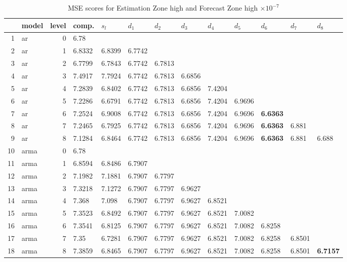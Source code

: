 \documentclass[10pt,a4paper]{article}
\begin{document}
\begin{table}[ht]
\centering
\caption{MSE scores for Estimation Zone high and Forecast Zone high $ \times 10^{-7}$} 
\begin{tabular}{rlrllllllllll}
  \hline
 & model & level & comp. & $s_l$ & $d_1$ & $d_2$ & $d_3$ & $d_4$ & $d_5$ & $d_6$ & $d_7$ & $d_8$ \\ 
  \hline
1 & ar &     0 & 6.78 &  &  &  &  &  &  &  &  &  \\ 
  2 & ar &     1 & 6.8332 & 6.8399 & 6.7742 &  &  &  &  &  &  &  \\ 
  3 & ar &     2 & 6.7799 & 6.7843 & 6.7742 & 6.7813 &  &  &  &  &  &  \\ 
  4 & ar &     3 & 7.4917 & 7.7924 & 6.7742 & 6.7813 & 6.6856 &  &  &  &  &  \\ 
  5 & ar &     4 & 7.2839 & 6.8402 & 6.7742 & 6.7813 & 6.6856 & 7.4204 &  &  &  &  \\ 
  6 & ar &     5 & 7.2286 & 6.6791 & 6.7742 & 6.7813 & 6.6856 & 7.4204 & 6.9696 &  &  &  \\ 
  7 & ar &     6 & 7.2524 & 6.9008 & 6.7742 & 6.7813 & 6.6856 & 7.4204 & 6.9696 & \textbf{6.6363} &  &  \\ 
  8 & ar &     7 & 7.2465 & 6.7925 & 6.7742 & 6.7813 & 6.6856 & 7.4204 & 6.9696 & \textbf{6.6363} & 6.881 &  \\ 
  9 & ar &     8 & 7.1284 & 6.8464 & 6.7742 & 6.7813 & 6.6856 & 7.4204 & 6.9696 & \textbf{6.6363} & 6.881 & 6.688 \\ 
   \hline
10 & arma &     0 & 6.78 &  &  &  &  &  &  &  &  &  \\ 
  11 & arma &     1 & 6.8594 & 6.8486 & 6.7907 &  &  &  &  &  &  &  \\ 
  12 & arma &     2 & 7.1982 & 7.1881 & 6.7907 & 6.7797 &  &  &  &  &  &  \\ 
  13 & arma &     3 & 7.3218 & 7.1272 & 6.7907 & 6.7797 & 6.9627 &  &  &  &  &  \\ 
  14 & arma &     4 & 7.368 & 7.098 & 6.7907 & 6.7797 & 6.9627 & 6.8521 &  &  &  &  \\ 
  15 & arma &     5 & 7.3523 & 6.8492 & 6.7907 & 6.7797 & 6.9627 & 6.8521 & 7.0082 &  &  &  \\ 
  16 & arma &     6 & 7.3541 & 6.8125 & 6.7907 & 6.7797 & 6.9627 & 6.8521 & 7.0082 & 6.8258 &  &  \\ 
  17 & arma &     7 & 7.35 & 6.7281 & 6.7907 & 6.7797 & 6.9627 & 6.8521 & 7.0082 & 6.8258 & 6.8501 &  \\ 
  18 & arma &     8 & 7.3859 & 6.8465 & 6.7907 & 6.7797 & 6.9627 & 6.8521 & 7.0082 & 6.8258 & 6.8501 & \textbf{6.7157} \\ 

\end{tabular}
\end{table}
\end{document}
